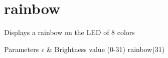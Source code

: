 \hypertarget{rainbow-example}{\section{rainbow}
}
Displays a rainbow on the L\-E\-D of 8 colors


\begin{DoxyParams}{Parameters}
{\em c} & Brightness value (0-\/31) rainbow(31)\\
\hline
\end{DoxyParams}

\begin{DoxyCodeInclude}
\end{DoxyCodeInclude}
 